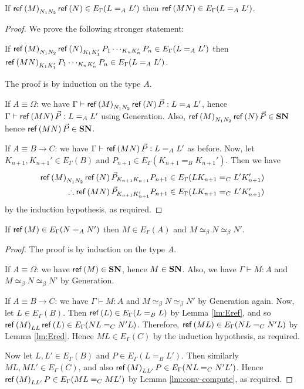 \begin{lm}
\label{lm:Ered}
If $\mathsf{ref} \left( {M} \right)_{N_1 N_2} \mathsf{ref} \left( {N} \right) \in E_\Gamma(L =_A L')$ then $\mathsf{ref} \left( {MN} \right) \in E_\Gamma(L =_A L')$.
\end{lm}

\begin{proof}
We prove the following stronger statement:

If $\mathsf{ref} \left( {M} \right)_{N_1 N_2} \mathsf{ref} \left( {N} \right)_{K_1 K_1'} P_1 \cdots_{K_n K_n'} P_n \in E_\Gamma(L =_A L')$ then \\
$\mathsf{ref} \left( {MN} \right)_{K_1 K_1'} P_1 \cdots_{K_n K_n'} P_n \in E_\Gamma(L =_A L')$.

The proof is by induction on the type $A$.

If $A \equiv \Omega$: we have $\Gamma \vdash \mathsf{ref} \left( {M} \right)_{N_1 N_2} \mathsf{ref} \left( {N} \right) \vec{P} : L =_A L'$, hence $\Gamma \vdash \mathsf{ref} \left( {MN} \right) \vec{P} : L =_A L'$
using Generation.  Also, $\mathsf{ref} \left( {M} \right)_{N_1 N_2} \mathsf{ref} \left( {N} \right) \vec{P} \in \mathbf{SN}$ hence $\mathsf{ref} \left( {MN} \right) \vec{P} \in \mathbf{SN}$.

If $A \equiv B \rightarrow C$: we have $\Gamma \vdash \mathsf{ref} \left( {MN} \right) \vec{P} : L =_A L'$ as before.  Now, let $K_{n+1}, K_{n+1}' \in E_\Gamma(B)$
and $P_{n+1} \in E_\Gamma(K_{n+1} =_B K_{n+1}')$.  Then we have
\begin{align*}
\mathsf{ref} \left( {M} \right)_{N_1 N_2} \mathsf{ref} \left( {N} \right) \vec{P}_{K_{n+1} K_{n+1}} P_{n+1} & \in E_\Gamma(LK_{n+1} =_C L'K_{n+1}') \\
\therefore \mathsf{ref} \left( {MN} \right) \vec{P}_{K_{n+1} K_{n+1}'} P_{n+1} & \in E_\Gamma(LK_{n+1} =_C L'K_{n+1}')
\end{align*}
by the induction hypothesis, as required.
\end{proof}

\begin{lm}
\label{lm:Egen}
If $\mathsf{ref} \left( {M} \right) \in E_\Gamma(N =_A N')$ then $M \in E_\Gamma(A)$ and $M \simeq_\beta N \simeq_\beta N'$.
\end{lm}

\begin{proof}
The proof is by induction on the type $A$.

If $A \equiv \Omega$: we have $\mathsf{ref} \left( {M} \right) \in \mathbf{SN}$, hence $M \in \mathbf{SN}$.  Also, we have $\Gamma \vdash M : A$ and $M \simeq_\beta N \simeq_\beta N'$
by Generation.

If $A \equiv B \rightarrow C$: we have $\Gamma \vdash M : A$ and $M \simeq_\beta N \simeq_\beta N'$ by Generation again.  Now, let $L \in E_\Gamma(B)$.
Then $\mathsf{ref} \left( {L} \right) \in E_\Gamma(L =_B L)$ by Lemma \ref{lm:Eref}, and so $\mathsf{ref} \left( {M} \right)_{LL} \mathsf{ref} \left( {L} \right) \in E_\Gamma(NL =_C N'L)$.  Therefore,
$\mathsf{ref} \left( {ML} \right) \in E_\Gamma(NL =_C N'L)$ by Lemma \ref{lm:Ered}.  Hence $ML \in E_\Gamma(C)$ by the induction hypothesis, as required.

Now let $L, L' \in E_\Gamma(B)$ and $P \in E_\Gamma(L =_B L')$.  Then similarly $ML, ML' \in E_\Gamma(C)$, and also $\mathsf{ref} \left( {M} \right)_{L L'} P \in E_\Gamma(NL =_C N'L')$.  Hence $\mathsf{ref} \left( {M} \right)_{L L'} P \in E_\Gamma(ML =_C ML')$
by Lemma \ref{lm:conv-compute}, as required.
\end{proof}

